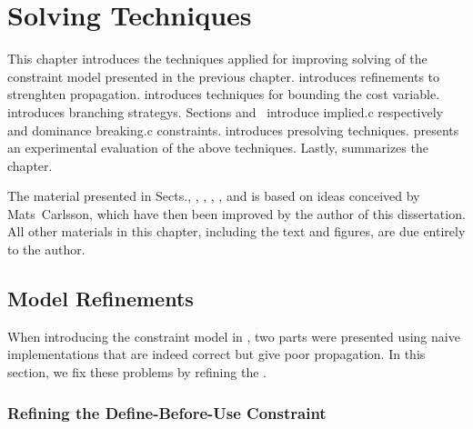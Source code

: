 %

\chapter{Solving Techniques}

This chapter introduces the techniques applied for improving solving of the
\gls{constraint model} presented in the previous chapter.
%
 introduces 
refinements to strenghten \gls{propagation}.
%
 introduces techniques for bounding the \gls{cost
  variable}.
%
 introduces \glspl{branching strategy}.
%
Sections\thinspace{}
and~ introduce \gls{implied.c} respectively
 and \gls{dominance breaking.c}
\glspl{constraint}.
%
 introduces \gls{presolving} techniques.
%
 presents an experimental evaluation of
the above techniques.
%
Lastly,  summarizes the chapter.

The material presented in Sects.\thinspace{},
, ,
, , and
 is based on ideas conceived by
Mats~Carlsson, which have then been improved by the author of this dissertation.
%
All other materials in this chapter, including the text and figures, are due
entirely to the author.


\section{Model Refinements}

When introducing the \gls{constraint model} in ,
two parts were presented using naive implementations that are indeed correct but
give poor \gls{propagation}.
%
In this section, we fix these problems by refining the .


\subsection{Refining the Define-Before-Use Constraint}

